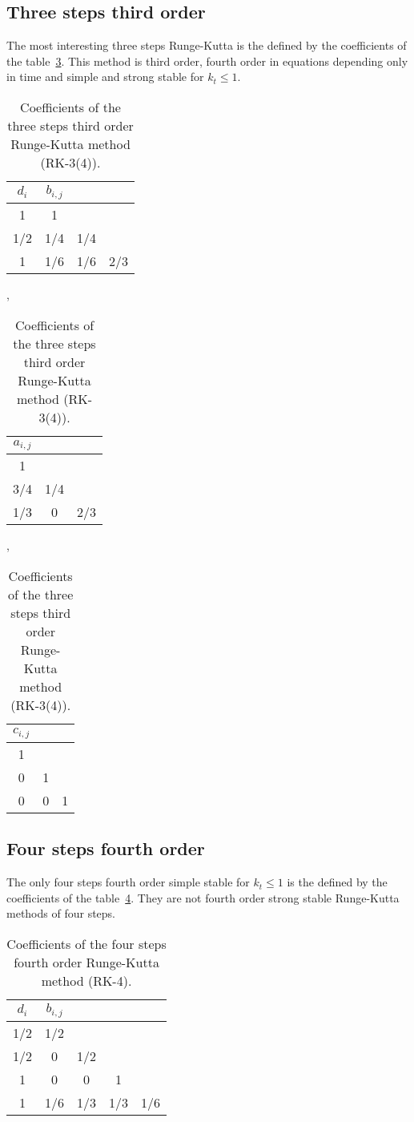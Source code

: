 \documentclass[a4paper]{article}
\begin{document}
\subsection{Three steps third order}

The most interesting three steps Runge-Kutta is the defined by the coefficients
of the table~\ref{TableRKiiiIII}.
This method is third order, fourth order in equations depending only in time and
simple and strong stable for $k_t\leq1$.
\begin{table}[ht]
	\centering
	\begin{tabular}{c|ccc}
		$d_{i}$ & $b_{i,j}$ \\ \hline
		1 & 1 \\
		1/2 & 1/4 & 1/4 \\
		1 & 1/6 & 1/6 & 2/3
	\end{tabular},~
	\begin{tabular}{ccc}
		$a_{i,j}$ \\ \hline
		1 \\
		3/4 & 1/4 \\
		1/3 & 0 & 2/3
	\end{tabular},~
	\begin{tabular}{ccc}
		$c_{i,j}$ \\ \hline
		1 \\
		0 & 1 \\
		0 & 0 & 1
	\end{tabular}
	\caption{Coefficients of the three steps third order Runge-Kutta method
		(RK-3(4)).\label{TableRKiiiIII}}
\end{table}

\subsection{Four steps fourth order}

The only four steps fourth order simple stable for $k_t\leq1$ is the defined by
the coefficients of the table~\ref{TableRKivIV}.
They are not fourth order strong stable Runge-Kutta methods of four steps.
\begin{table}[ht]
	\centering
	\begin{tabular}{c|cccc}
		$d_{i}$ & $b_{i,j}$ \\ \hline
		1/2 & 1/2 \\
		1/2 & 0 & 1/2 \\
		1 & 0 & 0 & 1 \\
		1 & 1/6 & 1/3 & 1/3 & 1/6
	\end{tabular}
	\caption{Coefficients of the four steps fourth order Runge-Kutta method
		(RK-4).\label{TableRKivIV}}
\end{table}
\end{document}
